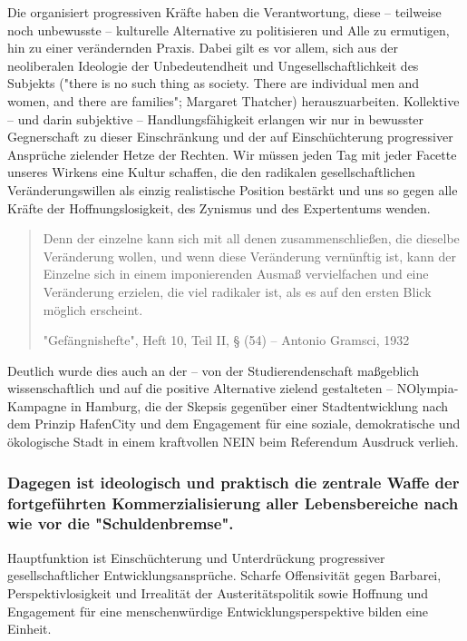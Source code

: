 \documentclass[ngerman,headheight=70pt]{scrartcl}
\begin{document}
    Die organisiert progressiven Kräfte haben die Verantwortung, diese --
    teilweise noch unbewusste -- kulturelle Alternative zu politisieren und Alle
    zu ermutigen, hin zu einer verändernden Praxis.  Dabei gilt es vor allem,
    sich aus der neoliberalen Ideologie der Unbedeutendheit und
    Ungesellschaftlichkeit des Subjekts ("there is no such thing as society.
    There are individual men and women, and there are families"; Margaret
    Thatcher) herauszuarbeiten. Kollektive -- und darin subjektive --
    Handlungsfähigkeit erlangen wir nur in bewusster Gegnerschaft zu dieser
    Einschränkung und der auf Einschüchterung progressiver Ansprüche zielender
    Hetze der Rechten. Wir müssen jeden Tag mit jeder Facette unseres Wirkens
    eine Kultur schaffen, die den radikalen gesellschaftlichen Veränderungswillen
    als einzig realistische Position bestärkt und uns so gegen alle Kräfte der
    Hoffnungslosigkeit, des Zynismus und des Expertentums wenden.

    \blockquote["Gefängnishefte", Heft 10, Teil II, § (54) -- Antonio Gramsci, 1932]{
    Denn der einzelne kann sich mit all denen zusammenschließen, die dieselbe
    Veränderung wollen, und wenn diese Veränderung vernünftig ist, kann der
    Einzelne sich in einem imponierenden Ausmaß vervielfachen und eine
    Veränderung erzielen, die viel radikaler ist, als es auf den ersten Blick
    möglich erscheint.}

    Deutlich wurde dies auch an der -- von der Studierendenschaft maßgeblich
    wissenschaftlich und auf die positive Alternative zielend gestalteten --
    NOlympia-Kampagne in Hamburg, die der Skepsis gegenüber einer
    Stadtentwicklung nach dem Prinzip HafenCity und dem Engagement für eine
    soziale, demokratische und ökologische Stadt in einem kraftvollen NEIN beim
    Referendum Ausdruck verlieh.

    \subsubsection{Dagegen ist ideologisch und praktisch die zentrale Waffe der
    fortgeführten Kommerzialisierung aller Lebensbereiche nach wie vor die
    "Schuldenbremse".}

    Hauptfunktion ist Einschüchterung und Unterdrückung progressiver
    gesellschaftlicher Entwicklungsansprüche. Scharfe Offensivität gegen
    Barbarei, Perspektivlosigkeit und Irrealität der Austeritätspolitik sowie
    Hoffnung und Engagement für eine menschenwürdige Entwicklungsperspektive
    bilden eine Einheit.
\end{document}
